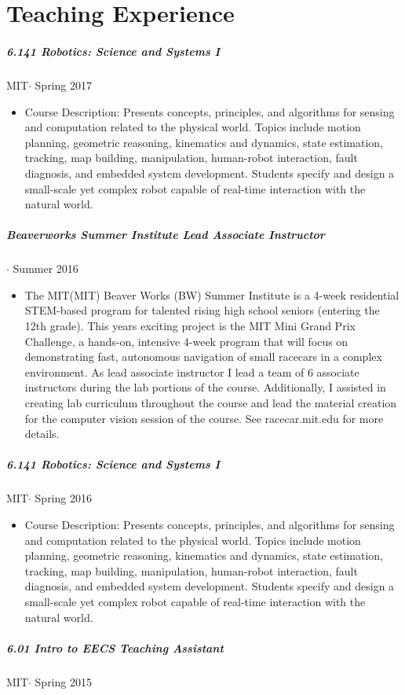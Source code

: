 \documentclass[10pt,letterpaper]{article}
\begin{document}
\section*{Teaching Experience}
\subparagraph{6.141 Robotics: Science and Systems I}
MIT$\cdot$ Spring 2017
\begin{itemize}
\item Course Description: Presents concepts, principles, and algorithms for sensing and computation related to the physical world. Topics include motion planning, geometric reasoning, kinematics and dynamics, state estimation, tracking, map building, manipulation, human-robot interaction, fault diagnosis, and embedded system development. Students specify and design a small-scale yet complex robot capable of real-time interaction with the natural world. 
\end{itemize}
\subparagraph{Beaverworks Summer Institute Lead Associate Instructor}
 $\cdot$ Summer 2016
\begin{itemize}
\item The MIT(MIT) Beaver Works (BW) Summer Institute is a 4-week residential STEM-based program for talented rising high school seniors (entering the 12th grade). This years exciting project is the MIT Mini Grand Prix Challenge, a hands-on, intensive 4-week program that will focus on demonstrating fast, autonomous navigation of small racecars in a complex environment. As lead associate instructor I lead a team of 6 associate instructors during the lab portions of the course.  Additionally, I assisted in creating lab curriculum throughout the course and lead the material creation for the computer vision session of the course. See racecar.mit.edu for more details.
\end{itemize}
\subparagraph{6.141 Robotics: Science and Systems I}
MIT$\cdot$ Spring 2016
\begin{itemize}
\item Course Description: Presents concepts, principles, and algorithms for sensing and computation related to the physical world. Topics include motion planning, geometric reasoning, kinematics and dynamics, state estimation, tracking, map building, manipulation, human-robot interaction, fault diagnosis, and embedded system development. Students specify and design a small-scale yet complex robot capable of real-time interaction with the natural world. 
\end{itemize}
\subparagraph{6.01 Intro to EECS Teaching Assistant}
MIT$\cdot$ Spring 2015
\end{document}
